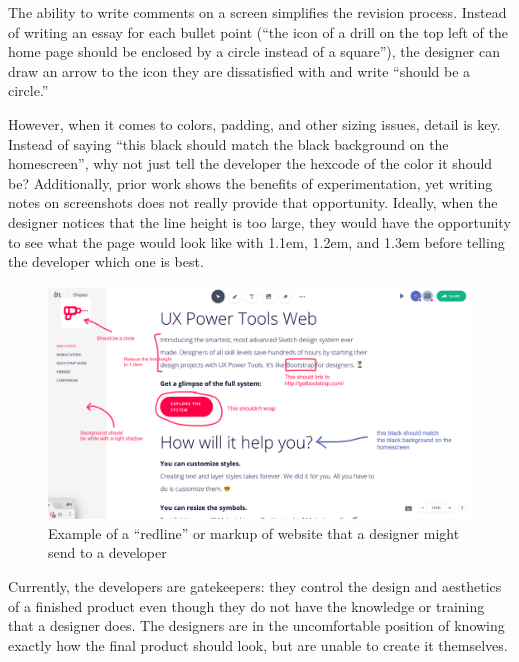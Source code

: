 \documentclass{sigchi}
\begin{document}
The ability to write comments on a screen simplifies the revision process. Instead of writing an essay for each bullet point (``the icon of a drill on the top left of the home page should be enclosed by a circle instead of a square''), the designer can draw an arrow to the icon they are dissatisfied with and write ``should be a circle.'' 

However, when it comes to colors, padding, and other sizing issues, detail is key. Instead of saying ``this black should match the black background on the homescreen'', why not just tell the developer the hexcode of the color it should be? Additionally, prior work shows the benefits of experimentation, yet writing notes on screenshots does not really provide that opportunity. Ideally, when the designer notices that the line height is too large, they would have the opportunity to see what the page would look like with 1.1em, 1.2em, and 1.3em before telling the developer which one is best. 

\begin{figure}
    \centering
    \includegraphics[width=\columnwidth]{figures/screenshot_redline_found_google.png}
    \caption{Example of a ``redline'' or markup of website that a designer might send to a developer}
    \label{fig:markup_redline_website}
\end{figure}


Currently, the developers are gatekeepers: they control the design and aesthetics of a finished product even though they do not have the knowledge or training that a designer does. The designers are in the uncomfortable position of knowing exactly how the final product should look, but are unable to create it themselves. 
\end{document}
